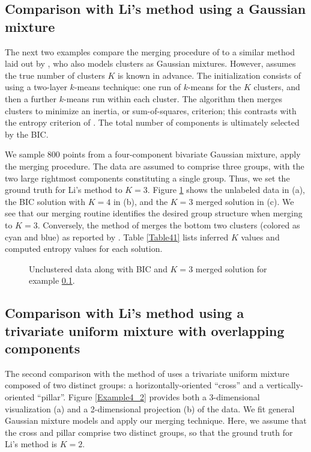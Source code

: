 \documentclass{uwstat572}
\renewcommand\;{\,}
\begin{document}
\subsection{Comparison with Li's method using a Gaussian mixture}\label{four}
The next two examples compare the merging procedure of \cite{Baudry10} to a similar method laid out by \cite{Li05}, who also models clusters as Gaussian mixtures.
However, \cite{Li05} assumes the true number of clusters $K$ is known in advance.
The initialization consists of using a two-layer $k$-means technique: one run of $k$-means for the $K$ clusters, and then a further $k$-means run within each cluster. 
The algorithm then merges clusters to minimize an inertia, or sum-of-squares, criterion; this contrasts with the entropy criterion of \cite{Baudry10}.
The total number of components is ultimately selected by the BIC.

We sample 800 points from a four-component bivariate Gaussian mixture, apply the merging procedure.
The data are assumed to comprise three groups, with the two large rightmost components constituting a single group.
Thus, we set the ground truth for Li's method to $K = 3$.
Figure \ref{Example4_1} shows the unlabeled data in (a), the BIC solution with $K = 4$ in (b), and the $K = 3$ merged solution in (c).
We see that our merging routine identifies the desired group structure when merging to $K = 3$.
Conversely, the method of \cite{Li05} merges the bottom two clusters (colored as cyan and blue) as reported by \cite{Baudry10}.
Table \ref{Table41} lists inferred $K$ values and computed entropy values for each solution.

\begin{figure}
\begin{center}
\end{center}
\caption{Unclustered data along with BIC and $K = 3$ merged solution for example \ref{four}.}
\label{Example4_1}
\end{figure}

\subsection{Comparison with Li's method using a trivariate uniform mixture with overlapping components}\label{five}
The second comparison with the method of \cite{Li05} uses a trivariate uniform mixture composed of two distinct groups: a horizontally-oriented ``cross'' and a vertically-oriented ``pillar''.
Figure \ref{Example4_2} provides both a 3-dimensional visualization (a) and a 2-dimensional projection (b) of the data.
We fit general Gaussian mixture models and apply our merging technique.
Here, we assume that the cross and pillar comprise two distinct groups, so that the ground truth for Li's method is $K = 2$. 
\end{document}
